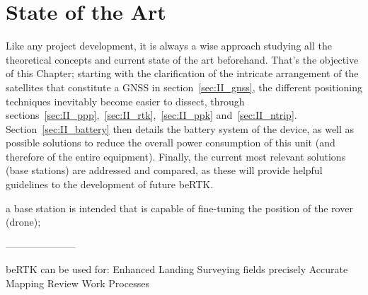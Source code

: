 

\glsresetall
\chapter{State of the Art}\label{cha:II_SotA}

Like any project development, it is always a wise approach studying all the theoretical concepts and current state of the art beforehand. That's the objective of this Chapter;
starting with the clarification of the intricate arrangement of the satellites that constitute a GNSS in section~\ref{sec:II_gnss}, the different positioning techniques inevitably become easier to dissect, through sections~\ref{sec:II_ppp},~\ref{sec:II_rtk},~\ref{sec:II_ppk} and~\ref{sec:II_ntrip}.
Section~\ref{sec:II_battery} then details the battery system of the device, as well as possible solutions to reduce the overall power consumption of this unit (and therefore of the entire equipment).
Finally, the current most relevant solutions (base stations) are addressed and compared, as these will provide helpful guidelines to the development of future beRTK.

a base station is intended that is capable of fine-tuning the position of the rover (drone);

---------------------

beRTK can be used for:
Enhanced Landing
Surveying fields precisely
Accurate Mapping
Review Work Processes

